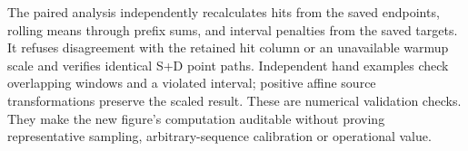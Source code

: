 The paired analysis independently recalculates hits from the saved endpoints, rolling means through prefix sums, and interval penalties from the saved targets. It refuses disagreement with the retained hit column or an unavailable warmup scale and verifies identical S+D point paths. Independent hand examples check overlapping windows and a violated interval; positive affine source transformations preserve the scaled result. These are numerical validation checks. They make the new figure's computation auditable without proving representative sampling, arbitrary-sequence calibration or operational value.
